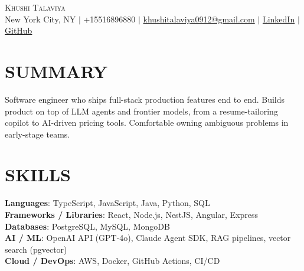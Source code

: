 \documentclass[letterpaper,11pt]{article}
\begin{document}
\begin{center}
    {\Huge \scshape Khushi Talaviya} \\ \vspace{2pt}
    \vspace{4pt}
    \small
    New York City, NY $|$
    \small
    +15516896880 $|$
    \href{mailto:khushitalaviya0912@gmail.com}{khushitalaviya0912@gmail.com} $|$
    \href{https://www.linkedin.com/in/khushitalaviya/}{LinkedIn} $|$
    \href{https://github.com/talaviyakhushi}{GitHub}
\end{center}

\section{SUMMARY}
\vspace{5pt}
\small{Software engineer who ships full-stack production features end to end. Builds product on top of LLM agents and frontier models, from a resume-tailoring copilot to AI-driven pricing tools. Comfortable owning ambiguous problems in early-stage teams.}

\vspace{2pt}
\section{SKILLS}
\vspace{5pt}
\begin{itemize}[leftmargin=0in, label={}]
\small{\item{
\textbf{Languages}{: TypeScript, JavaScript, Java, Python, SQL} \\
\textbf{Frameworks / Libraries}{: React, Node.js, NestJS, Angular, Express} \\
\textbf{Databases}{: PostgreSQL, MySQL, MongoDB} \\
\textbf{AI / ML}{: OpenAI API (GPT-4o), Claude Agent SDK, RAG pipelines, vector search (pgvector)} \\
\textbf{Cloud / DevOps}{: AWS, Docker, GitHub Actions, CI/CD}
}}
\end{itemize}
\vspace{-10pt}

\end{document}
